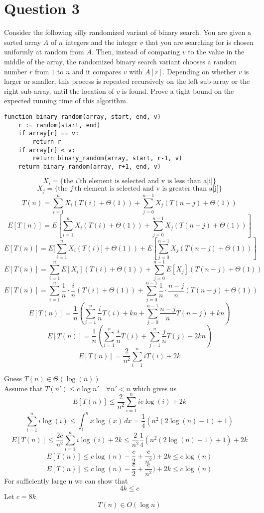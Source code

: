 \documentclass{article}
\begin{document}
\section*{Question 3}
Consider the following silly randomized variant of binary search. You are given
a sorted array $A$ of $n$ integers and the integer $v$ that you are searching for is chosen uniformly
at random from $A$. Then, instead of comparing $v$ to the value in the middle
of the array, the randomized binary search variant chooses a random number $r$ from $1$ to $n$ and
it compares $v$ with $A[r]$. Depending on whether $v$ is larger or smaller, this process is
repeated recursively on the left sub-array or the right sub-array, until the location of $v$ is
found. Prove a tight bound on the expected running time of this algorithm.

\begin{lstlisting}
function binary_random(array, start, end, v)
    r := random(start, end)
    if array[r] == v:
        return r
    if array[r] < v:
        return binary_random(array, start, r-1, v)
    return binary_random(array, r+1, end, v)
\end{lstlisting}

$$ X_{i} = \{\text{the $i$'th element is selected and v is less than a[i]} \} $$
$$ X_{j} = \{\text{the $j$'th element is selected and v is greater than a[j]} \}$$
$$ T(n) = \sum_{i=1}^{n}X_{i}(T(i) + \Theta(1)) +\sum_{j=0}^{n-1}X_{j}(T(n-j) + \Theta(1)) $$
$$ E [T(n)] = E[\sum_{i=1}^{n}X_{i}(T(i) + \Theta(1)) +\sum_{j=0}^{n-1}X_{j}(T(n-j) + \Theta(1))] $$
$$ E [T(n)] = E[\sum_{i=1}^{n}X_{i}(T(i)] + \Theta(1)) + E[\sum_{j=0}^{n-1}X_{j}(T(n-j) + \Theta(1))] $$
$$ E [T(n)] = \sum_{i=1}^{n}E[X_{i}](T(i) + \Theta(1)) + \sum_{j=0}^{n-1}E[X_{j}](T(n-j) + \Theta(1)) $$
$$ E [T(n)] = \sum_{i=1}^{n}\frac{1}{n}\cdot\frac{i}{n}(T(i) + \Theta(1)) + \sum_{j=0}^{n-1}\frac{1}{n}\cdot\frac{n-j}{n}(T(n-j) + \Theta(1)) $$
$$ E [T(n)] = \frac{1}{n}(\sum_{i=1}^{n}\frac{i}{n}T(i) + kn + \sum_{j=0}^{n-1}\frac{n-j}{n}T(n-j) + kn) $$
$$ E [T(n)] = \frac{1}{n}(\sum_{i=1}^{n}\frac{i}{n}T(i) + \sum_{j=1}^{n}\frac{j}{n}T(j) + 2kn) $$
$$ E [T(n)] = \frac{2}{n^2}\sum_{i=1}^{n}iT(i) + 2k $$

Guess $T(n) \in \Theta(\log(n))$ \\
Assume that $T(n') \leq c\log{n'} \quad \forall n' < n$ which gives us
$$ E [T(n)] \leq \frac{2}{n^2}\sum_{i=1}^{n}ic\log(i) + 2k $$
$$ \sum_{i=1}^{n}i\log(i) \leq \int_{1}^{n} x\log(x)\,dx = \frac{1}{4}(n^2(2\log(n) - 1) + 1) $$
$$ E [T(n)] \leq \frac{2c}{n^2}\sum_{i=1}^{n}i\log(i) + 2k \leq \frac{2}{n^2}\frac{1}{4}(n^2(2\log(n) - 1) + 1) + 2k $$
$$ E [T(n)] \leq c\log(n) - \frac{c}{2} + \frac{c}{n^2}) + 2k \leq c\log(n)$$
$$ E [T(n)] \leq c\log(n) - \frac{c}{2} + \frac{c}{n^2}) + 2k \leq c\log(n)$$
For sufficiently large n we can show that
$$ 4k \leq c $$
Let $ c = 8k $
$$ T(n) \in O(\log{n})$$
\end{document}
